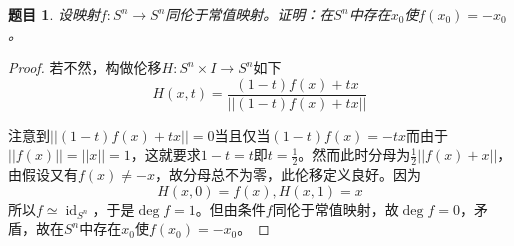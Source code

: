 \documentclass[UTF-8,11pt,fancyhdr,hyperref,titlepage]{ctexart}
\theoremstyle{question}
\newtheorem{timu}{题目}
\theoremstyle{theorem}
\theoremstyle{definition}
\theoremstyle{remark}
\def\longto{\longrightarrow}
\def\To{\longto}
\DeclareMathOperator{\id}{id}
\begin{document}
\begin{timu}\label{22}
  设映射$f\colon S^n\To S^n$同伦于常值映射。证明：在$S^n$中存在$x_0$使$f(x_0)=-x_0$。
\end{timu}
\begin{proof}
  若不然，构做伦移$H\colon S^n\times I\To S^n$如下
  \begin{equation*}
    H(x,t)=\frac{(1-t)f(x)+tx}{||(1-t)f(x)+tx||}
  \end{equation*}
  
  注意到$||(1-t)f(x)+tx||=0$当且仅当$(1-t)f(x)=-tx$而由于$||f(x)||=||x||=1$，这就要求$1-t=t$即$t=\frac{1}{2}$。然而此时分母为$\frac{1}{2}||f(x)+x||$，由假设又有$f(x)\neq -x$，故分母总不为零，此伦移定义良好。因为
  \begin{equation*}
     H(x,0)=f(x),  H(x,1)=x
  \end{equation*}
  所以$f\simeq\id_{S^n}$，于是$\deg f=1$。但由条件$f$同伦于常值映射，故$\deg f=0$，矛盾，故在$S^n$中存在$x_0$使$f(x_0)=-x_0$。
\end{proof}
\end{document}
